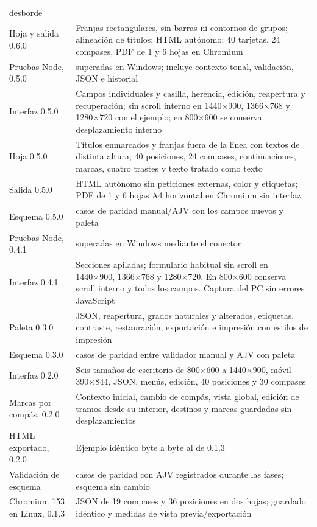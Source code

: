 \documentclass[a4paper,11pt]{article}
\begin{document}
{\begin{longtable}[]{@{}>{\raggedright\arraybackslash}p{}>{\raggedright\arraybackslash}p{}@{}}
desborde \\
Hoja y salida 0.6.0 & Franjas rectangulares, sin barras ni contornos de
grupos; alineación de títulos; HTML autónomo; 40 tarjetas, 24 compases,
PDF de 1 y 6 hojas en Chromium \\
Pruebas Node, 0.5.0 & 171 superadas en Windows; incluye contexto tonal,
validación, JSON e historial \\
Interfaz 0.5.0 & Campos individuales y casilla, herencia, edición,
reapertura y recuperación; sin scroll interno en 1440×900, 1366×768 y
1280×720 con el ejemplo; en 800×600 se conserva desplazamiento
interno \\
Hoja 0.5.0 & Títulos enmarcados y franjas fuera de la línea con textos
de distinta altura; 40 posiciones, 24 compases, continuaciones, marcas,
cuatro trastes y texto tratado como texto \\
Salida 0.5.0 & HTML autónomo sin peticiones externas, color y etiquetas;
PDF de 1 y 6 hojas A4 horizontal en Chromium sin interfaz \\
Esquema 0.5.0 & 1751 casos de paridad manual/AJV con los campos nuevos y
paleta \\
Pruebas Node, 0.4.1 & 150 superadas en Windows mediante el conector \\
Interfaz 0.4.1 & Secciones apiladas; formulario habitual sin scroll en
1440×900, 1366×768 y 1280×720. En 800×600 conserva scroll interno y
todos los campos. Captura del PC sin errores JavaScript \\
Paleta 0.3.0 & JSON, reapertura, grados naturales y alterados,
etiquetas, contraste, restauración, exportación e impresión con estilos
de impresión \\
Esquema 0.3.0 & 1685 casos de paridad entre validador manual y AJV con
paleta \\
Interfaz 0.2.0 & Seis tamaños de escritorio de 800×600 a 1440×900, móvil
390×844, JSON, menús, edición, 40 posiciones y 30 compases \\
Marcas por compás, 0.2.0 & Contexto inicial, cambio de compás, vista
global, edición de tramos desde su interior, destinos y marcas guardadas
sin desplazamientos \\
HTML exportado, 0.2.0 & Ejemplo idéntico byte a byte al de 0.1.3 \\
Validación de esquema & 1575 casos de paridad con AJV registrados
durante las fases; esquema sin cambio \\
Chromium 153 en Linux, 0.1.3 & JSON de 19 compases y 36 posiciones en
dos hojas; guardado idéntico y medidas de vista previa/exportación

\end{longtable}}
\end{document}

